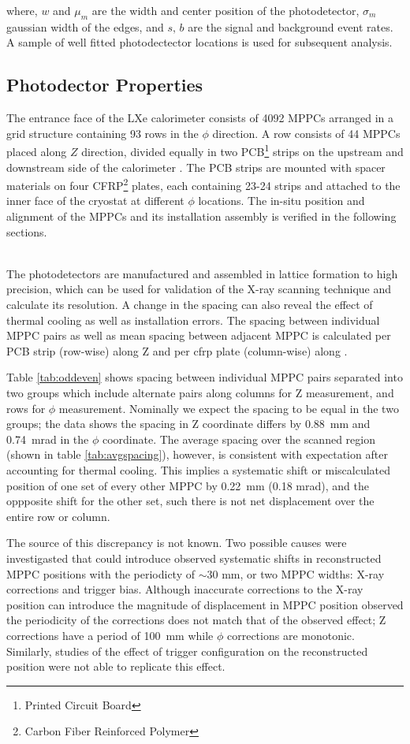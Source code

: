 \noindent where, $w$ and $\mu_m$ are the width and center position of
the photodetector, $\sigma_m$ gaussian width of the edges, and $s,\,b$
are the signal and background event rates. A sample of well fitted
photodectector locations is used for  subsequent analysis.


\subsection{Photodector Properties}
The entrance face of the LXe calorimeter consists of 4092 MPPCs
arranged in a grid structure containing 93 rows in the $\phi$ direction.  
A row consists of 44 MPPCs placed along $Z$ direction, divided equally in two
PCB\footnote{Printed Circuit Board} strips on the upstream and
downstream side of the calorimeter \cite{megdesign}.  The PCB strips
are mounted with spacer materials on four CFRP\footnote{Carbon Fiber
Reinforced Polymer} plates, each containing 23-24 strips and attached
to the inner face of the cryostat at different $\phi$ locations.  The
in-situ position and alignment of the MPPCs and its installation
assembly is verified in the following sections.

\\
The photodetectors are manufactured and assembled in lattice formation
to high precision, which can be used for validation of the X-ray
scanning technique and calculate its resolution.  A change in the
spacing can also reveal the effect of thermal cooling as well as
installation errors.  The spacing between individual MPPC pairs as
well as mean spacing between adjacent MPPC is calculated per PCB strip
(row-wise) along Z and per cfrp plate (column-wise) along \phis. 

Table \ref{tab:oddeven} shows spacing between individual MPPC pairs separated
into two groups which include alternate pairs along columns for Z measurement,
and rows for $\phi$ measurement.  Nominally we expect the spacing to be equal in
the two groups; the data shows the spacing in Z coordinate differs by 0.88~mm
and 0.74~mrad in the $\phi$ coordinate.  The average spacing over the scanned
region (shown in table \ref{tab:avgspacing}), however, is consistent with
expectation after accounting for thermal cooling.  
This implies a systematic shift or miscalculated position 
of one set of every other MPPC by 0.22~mm (0.18 mrad), and the oppposite 
shift for the other set, such there is not net displacement over the entire
row or column. 


The source of this discrepancy is not known.
Two possible causes were investigasted that could introduce observed 
systematic shifts in reconstructed MPPC positions with the periodicty of 
$\sim$30 mm, or two MPPC widths: X-ray corrections and trigger bias.
Although inaccurate corrections to the X-ray position can introduce the magnitude of 
displacement in MPPC position observed the periodicity of the corrections
does not match that of the observed effect; Z corrections have a period of 
100~mm while $\phi$ corrections are monotonic.
Similarly, studies of the effect of trigger configuration on the reconstructed position 
were not able to replicate this effect. 


